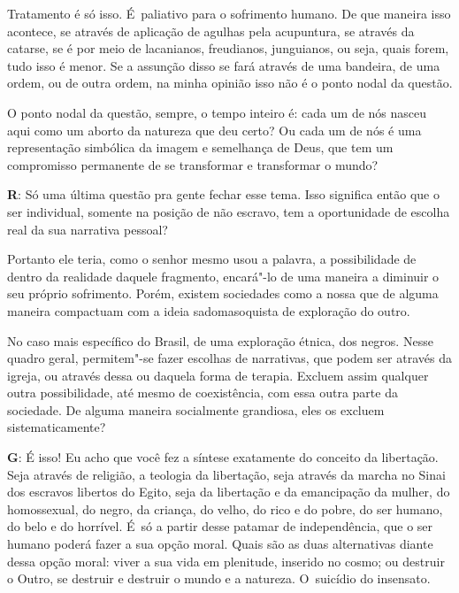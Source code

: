Tratamento é só isso. É~paliativo para o sofrimento humano. De que
maneira isso acontece, se através de aplicação de agulhas pela
acupuntura, se através da catarse, se é por meio de lacanianos,
freudianos, junguianos, ou seja, quais forem, tudo isso é menor. Se a
assunção disso se fará através de uma bandeira, de uma ordem, ou de
outra ordem, na minha opinião isso não é o ponto nodal da questão.

 

O ponto nodal da questão, sempre, o tempo inteiro é: cada um de nós
nasceu aqui como um aborto da natureza que deu certo? Ou cada um de nós
é uma representação simbólica da imagem e semelhança de Deus, que tem um
compromisso permanente de se transformar e transformar o mundo?

 

\textbf{R}: Só uma última questão pra gente fechar esse tema. Isso
significa então que o ser individual, somente na posição de não
escravo, tem a oportunidade de escolha real da sua narrativa pessoal?

 

Portanto ele teria, como o senhor mesmo usou a palavra, a possibilidade
de dentro da realidade daquele fragmento, encará"-lo de uma maneira a
diminuir o seu próprio sofrimento. Porém, existem sociedades como a
nossa que de alguma maneira compactuam com a ideia sadomasoquista de
exploração do outro.

 

No caso mais específico do Brasil, de uma exploração étnica, dos negros.
Nesse quadro geral, permitem"-se fazer escolhas de narrativas, que podem
ser através da igreja, ou através dessa ou daquela forma de terapia.
Excluem assim qualquer outra possibilidade, até mesmo de coexistência,
com essa outra parte da sociedade. De alguma maneira socialmente
grandiosa, eles os excluem sistematicamente?

 

\textbf{G}: É isso! Eu acho que você fez a síntese exatamente do
conceito da libertação. Seja através de religião, a teologia da
libertação, seja através da marcha no Sinai dos escravos libertos do
Egito, seja da libertação e da emancipação da mulher, do homossexual, do
negro, da criança, do velho, do rico e do pobre, do ser humano, do belo
e do horrível. É~só a partir desse patamar de independência, que o ser
humano poderá fazer a sua opção moral. Quais são as duas alternativas
diante dessa opção moral: viver a sua vida em plenitude, inserido no
cosmo; ou destruir o Outro, se destruir e destruir o mundo e a natureza.
O~suicídio do insensato.

\fechafala 
